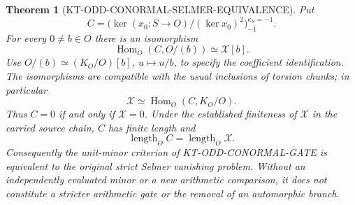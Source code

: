 \documentclass[11pt,a4paper]{article}
\newtheorem{theorem}{Theorem}[section]
\theoremstyle{definition}
\begin{document}
\begin{theorem}[KT-ODD-CONORMAL-SELMER-EQUIVALENCE]
Put
\[
 C=\bigl(\ker(x_0:S\to O)/(\ker x_0)^2\bigr)_{-1}^{\kappa_S=-1}.
                                                                  \tag{KE.2}
\]
For every $0\ne b\in O$ there is an isomorphism
\[
        \operatorname{Hom}_O(C,O/(b))\simeq\mathcal X[b].    \tag{KE.3}
\]
Use $O/(b)\simeq(K_O/O)[b]$, $u\mapsto u/b$, to specify
the coefficient identification.  The isomorphisms are
compatible with the usual inclusions of torsion chunks;
in particular
\[
             \mathcal X\simeq\operatorname{Hom}_O(C,K_O/O).
                                                                  \tag{KE.4}
\]
Thus $C=0$ if and only if $\mathcal X=0$.  Under the
established finiteness of $\mathcal X$ in the carried
source chain, $C$ has finite length and
\[
                  \operatorname{length}_O C
                       =\operatorname{length}_O\mathcal X. \tag{KE.5}
\]
Consequently the unit-minor criterion of
KT-ODD-CONORMAL-GATE is equivalent to the original strict
Selmer vanishing problem.  Without an independently
evaluated minor or a new arithmetic comparison, it does
not constitute a stricter arithmetic gate or the removal
of an automorphic branch.
\end{theorem}
\end{document}
